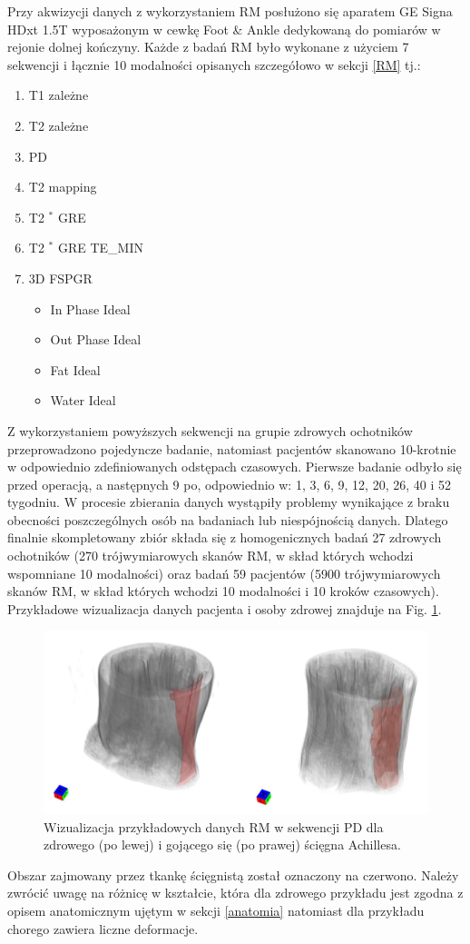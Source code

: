 Przy akwizycji danych z wykorzystaniem RM posłużono się aparatem GE Signa HDxt 1.5T wyposażonym w cewkę Foot \& Ankle dedykowaną do pomiarów w rejonie dolnej kończyny. Każde z badań RM było wykonane z użyciem 7 sekwencji i łącznie 10 modalności opisanych szczegółowo w sekcji \ref{RM} tj.:
\begin{enumerate}
	\item T1 zależne
	\item T2 zależne
	\item PD
	\item T2 mapping
	\item T2 $^\ast$ GRE
	\item T2 $^\ast$ GRE TE\_MIN
	\item 3D FSPGR
	\begin{itemize}
		\item In Phase Ideal
		\item Out Phase Ideal
		\item Fat Ideal
		\item Water Ideal 
	\end{itemize}
\end{enumerate}

Z wykorzystaniem powyższych sekwencji na grupie zdrowych ochotników przeprowadzono pojedyncze badanie, natomiast pacjentów skanowano 10-krotnie w odpowiednio zdefiniowanych odstępach czasowych. Pierwsze badanie odbyło się przed operacją, a następnych 9 po, odpowiednio w: 1, 3, 6, 9, 12, 20, 26, 40 i 52 tygodniu. W procesie zbierania danych wystąpiły problemy wynikające z braku obecności poszczególnych osób na badaniach lub niespójnością danych. Dlatego finalnie skompletowany zbiór składa się z homogenicznych badań 27 zdrowych ochotników (270 trójwymiarowych skanów RM, w skład których wchodzi wspomniane 10 modalności) oraz badań 59 pacjentów (5900 trójwymiarowych skanów RM, w skład których wchodzi 10 modalności i 10 kroków czasowych). Przykładowe wizualizacja danych pacjenta i osoby zdrowej znajduje na Fig. \ref{fig:MRI_sample}. 
\begin{figure}[h!]
	\includegraphics[width=\textwidth]{figures/Data_MRI_sample.png}
	\caption{Wizualizacja przykładowych danych RM w sekwencji PD dla zdrowego (po lewej) i gojącego się (po prawej) ścięgna Achillesa.}
	 \label{fig:MRI_sample}
\end{figure}
Obszar zajmowany przez tkankę ścięgnistą został oznaczony na czerwono. Należy zwrócić uwagę na różnicę w kształcie, która dla zdrowego przykładu jest zgodna z opisem anatomicznym ujętym w sekcji \ref{anatomia} natomiast dla przykładu chorego zawiera liczne deformacje.

